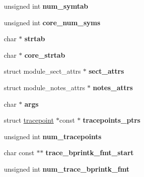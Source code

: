 \begin{DoxyCompactItemize}
\item 
\hypertarget{structmodule_a1c2a29002c6fbdd9fa558abe3b7b08e8}{}unsigned int {\bfseries num\+\_\+symtab}\label{structmodule_a1c2a29002c6fbdd9fa558abe3b7b08e8}

\item 
\hypertarget{structmodule_a7f9a01c1d3807937db128853bec91946}{}unsigned int {\bfseries core\+\_\+num\+\_\+syms}\label{structmodule_a7f9a01c1d3807937db128853bec91946}

\item 
\hypertarget{structmodule_a175b2d9976b04af96f268f3ec383df4b}{}char $\ast$ {\bfseries strtab}\label{structmodule_a175b2d9976b04af96f268f3ec383df4b}

\item 
\hypertarget{structmodule_a4dd9da227882b798627da7bb9c27c19a}{}char $\ast$ {\bfseries core\+\_\+strtab}\label{structmodule_a4dd9da227882b798627da7bb9c27c19a}

\item 
\hypertarget{structmodule_a244a920dd8c392b893d7f8a3cb243480}{}struct module\+\_\+sect\+\_\+attrs $\ast$ {\bfseries sect\+\_\+attrs}\label{structmodule_a244a920dd8c392b893d7f8a3cb243480}

\item 
\hypertarget{structmodule_a72076ec8a594fc1e8628746f8dad94dc}{}struct module\+\_\+notes\+\_\+attrs $\ast$ {\bfseries notes\+\_\+attrs}\label{structmodule_a72076ec8a594fc1e8628746f8dad94dc}

\item 
\hypertarget{structmodule_a97ba9ca16521410f9a998fa61f4a0744}{}char $\ast$ {\bfseries args}\label{structmodule_a97ba9ca16521410f9a998fa61f4a0744}

\item 
\hypertarget{structmodule_a0f95947400b2f9c9f79d331b903f8632}{}struct \hyperlink{structtracepoint}{tracepoint} $\ast$const $\ast$ {\bfseries tracepoints\+\_\+ptrs}\label{structmodule_a0f95947400b2f9c9f79d331b903f8632}

\item 
\hypertarget{structmodule_ad2de1b0d88b1e3df6fbea9767c78c5a1}{}unsigned int {\bfseries num\+\_\+tracepoints}\label{structmodule_ad2de1b0d88b1e3df6fbea9767c78c5a1}

\item 
\hypertarget{structmodule_a37ad8a6ed5e82d856eefea62591e1ab9}{}char const $\ast$$\ast$ {\bfseries trace\+\_\+bprintk\+\_\+fmt\+\_\+start}\label{structmodule_a37ad8a6ed5e82d856eefea62591e1ab9}

\item 
\hypertarget{structmodule_a4a06e45336c25f4222df5b96163b640f}{}unsigned int {\bfseries num\+\_\+trace\+\_\+bprintk\+\_\+fmt}\label{structmodule_a4a06e45336c25f4222df5b96163b640f}


\end{DoxyCompactItemize}

